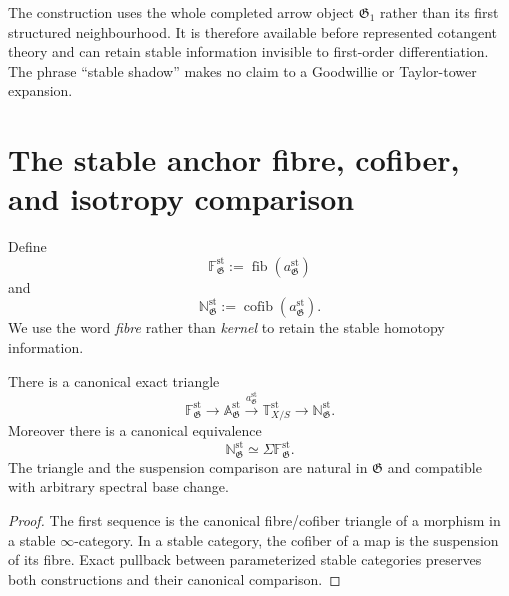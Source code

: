 \begin{remark}
The construction uses the whole completed arrow object $\mathfrak G_1$ rather
than its first structured neighbourhood.  It is therefore available before
represented cotangent theory and can retain stable information invisible to
first-order differentiation.  The phrase ``stable shadow'' makes no claim to
a Goodwillie or Taylor-tower expansion.
\end{remark}

\section{The stable anchor fibre, cofiber, and isotropy comparison}
\label{sec:bnla-anchor-triangle}

\begin{definition}
\label{def:bnla-stable-kernel-normal}
Define
\[
    \mathbb F^{\mathrm{st}}_{\mathfrak G}
    :=
    \operatorname{fib}
    \left(a^{\mathrm{st}}_{\mathfrak G}\right)
\]
and
\[
    \mathbb N^{\mathrm{st}}_{\mathfrak G}
    :=
    \operatorname{cofib}
    \left(a^{\mathrm{st}}_{\mathfrak G}\right).
\]
We use the word \emph{fibre} rather than \emph{kernel} to retain the stable
homotopy information.
\end{definition}

\begin{theorem}
\label{thm:bnla-stable-anchor-triangle}
There is a canonical exact triangle
\[
    \mathbb F^{\mathrm{st}}_{\mathfrak G}
    \longrightarrow
    \mathbb A^{\mathrm{st}}_{\mathfrak G}
    \xrightarrow{a^{\mathrm{st}}_{\mathfrak G}}
    \mathbb T^{\mathrm{st}}_{X/S}
    \longrightarrow
    \mathbb N^{\mathrm{st}}_{\mathfrak G}.
\]
Moreover there is a canonical equivalence
\[
    \boxed{
    \mathbb N^{\mathrm{st}}_{\mathfrak G}
    \simeq
    \Sigma\mathbb F^{\mathrm{st}}_{\mathfrak G}.}
\]
The triangle and the suspension comparison are natural in $\mathfrak G$ and
compatible with arbitrary spectral base change.
\end{theorem}

\begin{proof}
The first sequence is the canonical fibre/cofiber triangle of a morphism in a
stable $\infty$-category.  In a stable category, the cofiber of a map is the
suspension of its fibre.  Exact pullback between parameterized stable
categories preserves both constructions and their canonical comparison.
\end{proof}

